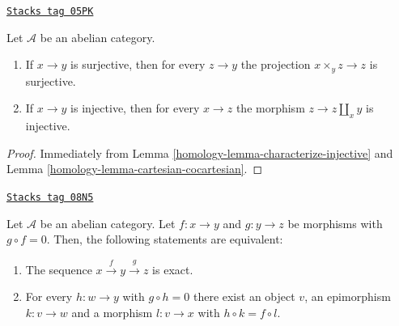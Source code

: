 \begin{lemma}
\label{homology-lemma-epimorphism-universal-abelian-category}
\href{https://stacks.math.columbia.edu/tag/05PK}{\texttt{Stacks tag 05PK}}

Let $\mathcal{A}$ be an abelian category.
\begin{enumerate}
\item If $x \to y$ is surjective, then for every $z \to y$ the
projection $x \times_y z \to z$ is surjective.
\item If $x \to y$ is injective, then for every $x \to z$ the
morphism $z \to z \amalg_x y$ is injective.
\end{enumerate}
\end{lemma}

\begin{proof}

Immediately from Lemma \ref{homology-lemma-characterize-injective} and
Lemma \ref{homology-lemma-cartesian-cocartesian}.
\end{proof}

\begin{lemma}
\label{homology-lemma-check-exactness-fibre-product}
\href{https://stacks.math.columbia.edu/tag/08N5}{\texttt{Stacks tag 08N5}}

Let $\mathcal{A}$ be an abelian category. Let $f:x\to y$ and $g:y\to z$
be morphisms with $g\circ f=0$. Then, the following statements are equivalent:
\begin{enumerate}
\item The sequence $x\overset{f}\to y\overset{g}\to z$ is exact.
\item For every $h:w\to y$ with $g\circ h=0$ there exist an object $v$,
an epimorphism $k:v\to w$ and a morphism $l:v\to x$ with $h\circ k=f\circ l$.
\end{enumerate}
\end{lemma}

